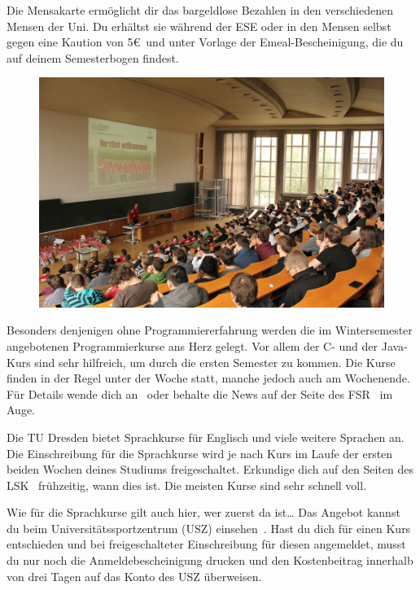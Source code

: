 \begin{itemize}[leftmargin=*]
Die Mensakarte ermöglicht dir das bargeldlose Bezahlen in den verschiedenen
Mensen der Uni. Du erhältst sie während der ESE oder in den Mensen selbst gegen
eine Kaution von 5\euro\ und unter Vorlage der Emeal-Bescheinigung, die du auf
deinem Semesterbogen findest.

\begin{figure}[b!]
\centering
\includegraphics[width=.99\linewidth]{img/ese2013/barschoe.jpg}
\end{figure}

Besonders denjenigen ohne Programmiererfahrung werden die im Wintersemester
angebotenen Programmierkurse ans Herz gelegt. Vor allem der C- und der Java-Kurs
sind sehr hilfreich, um durch die ersten Semester zu kommen. Die Kurse finden in
der Regel unter der Woche statt, manche jedoch auch am Wochenende. Für Details
wende dich an~ oder behalte die News auf der
Seite des FSR~ im Auge.

Die TU Dresden bietet Sprachkurse für Englisch und viele weitere Sprachen an.
Die Einschreibung für die Sprachkurse wird je nach Kurs im Laufe der ersten
beiden Wochen deines Studiums freigeschaltet. Erkundige dich auf den Seiten des
LSK~ frühzeitig, wann dies ist. Die
meisten Kurse sind sehr schnell voll.

Wie für die Sprachkurse gilt auch hier, wer zuerst da ist\ldots{} Das Angebot
kannst du beim Universitätssportzentrum (USZ) einsehen~. Hast du dich für einen Kurs entschieden und
bei freigeschalteter Einschreibung für diesen angemeldet, musst du nur noch die
Anmeldebescheinigung drucken und den Kostenbeitrag innerhalb von drei Tagen auf
das Konto des USZ überweisen.


\end{itemize}
